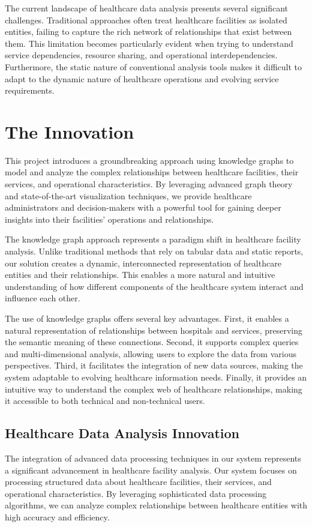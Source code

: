 \documentclass[12pt,a4paper]{report}
\begin{document}
The current landscape of healthcare data analysis presents several significant challenges. Traditional approaches often treat healthcare facilities as isolated entities, failing to capture the rich network of relationships that exist between them. This limitation becomes particularly evident when trying to understand service dependencies, resource sharing, and operational interdependencies. Furthermore, the static nature of conventional analysis tools makes it difficult to adapt to the dynamic nature of healthcare operations and evolving service requirements.

\section{The Innovation}
This project introduces a groundbreaking approach using knowledge graphs to model and analyze the complex relationships between healthcare facilities, their services, and operational characteristics. By leveraging advanced graph theory and state-of-the-art visualization techniques, we provide healthcare administrators and decision-makers with a powerful tool for gaining deeper insights into their facilities' operations and relationships.

The knowledge graph approach represents a paradigm shift in healthcare facility analysis. Unlike traditional methods that rely on tabular data and static reports, our solution creates a dynamic, interconnected representation of healthcare entities and their relationships. This enables a more natural and intuitive understanding of how different components of the healthcare system interact and influence each other.

The use of knowledge graphs offers several key advantages. First, it enables a natural representation of relationships between hospitals and services, preserving the semantic meaning of these connections. Second, it supports complex queries and multi-dimensional analysis, allowing users to explore the data from various perspectives. Third, it facilitates the integration of new data sources, making the system adaptable to evolving healthcare information needs. Finally, it provides an intuitive way to understand the complex web of healthcare relationships, making it accessible to both technical and non-technical users.

\subsection{Healthcare Data Analysis Innovation}
The integration of advanced data processing techniques in our system represents a significant advancement in healthcare facility analysis. Our system focuses on processing structured data about healthcare facilities, their services, and operational characteristics. By leveraging sophisticated data processing algorithms, we can analyze complex relationships between healthcare entities with high accuracy and efficiency.
\end{document}
